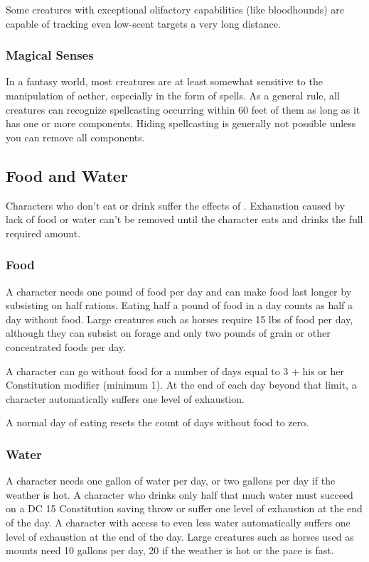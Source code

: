 Some creatures with exceptional olifactory capabilities (like bloodhounds) are capable of tracking even low-scent targets a very long distance.

\subsubsection{Magical Senses}
In a fantasy world, most creatures are at least somewhat sensitive to the manipulation of aether, especially in the form of spells. As a general rule, all creatures can recognize spellcasting occurring within 60 feet of them as long as it has one or more components. Hiding spellcasting is generally not possible unless you can remove all components.

\subsection{Food and Water}

Characters who don't eat or drink suffer the effects of . Exhaustion caused by lack of food or water can't be removed until the character eats and drinks the full required amount.

\subsubsection{Food}

A character needs one pound of food per day and can make food last longer by subsisting on half rations. Eating half a pound of food in a day counts as half a day without food. Large creatures such as horses require 15 lbs of food per day, although they can subsist on forage and only two pounds of grain or other concentrated foods per day.

A character can go without food for a number of days equal to 3 + his or her Constitution modifier (minimum 1). At the end of each day beyond that limit, a character automatically suffers one level of exhaustion.

A normal day of eating resets the count of days without food to zero.

\subsubsection{Water}

A character needs one gallon of water per day, or two gallons per day if the weather is hot. A character who drinks only half that much water must succeed on a DC 15 Constitution saving throw or suffer one level of exhaustion at the end of the day. A character with access to even less water automatically suffers one level of exhaustion at the end of the day. Large creatures such as horses used as mounts need 10 gallons per day, 20 if the weather is hot or the pace is fast. 

